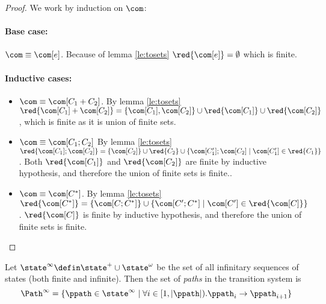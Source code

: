 \begin{proof}
  We work by induction on \(\com\):

  \noindent
  \paragraph*{Base case:\\}
  
  \(\com \equiv \com[e]\). Because of lemma \ref{le:tosets}
  \(\red{\com[e]} = \emptyset\) which is finite.

  \noindent
  \paragraph*{Inductive cases:\\}
  \begin{itemize}
  \item \(\com \equiv \com[C_1 + C_2]\). By lemma \ref{le:tosets}
    \(\red{\com[C_1] + \com[C_2]} = \{\com[C_1], \com[C_2]\} \cup
    \red{\com[C_1]} \cup \red{\com[C_2]}\), which is finite as it is
    union of finite sets.
  \item \(\com \equiv \com[C_1;C_2]\) By lemma \ref{le:tosets}
    \(\red{\com[C_1]; \com[C_2]} =
    \{\com[C_2]\}\cup\red{C_2}\cup\{\com[C_1'];\com[C_2] \mid
    \com[C_1']\in\red{C_1}\}\). Both \(\red{\com[C_1]}\) and
    \(\red{\com[C_2]}\) are finite by inductive hypothesis, and
    therefore the union of finite sets is finite..
  \item \(\com \equiv \com[C^*]\). By lemma \ref{le:tosets}
    \(\red{\com[C^*]} = \{\com[C;C^*]\} \cup \{\com[C';C^*] \mid
    \com[C']\in\red{\com[C]}\}\). \(\red{\com[C]}\) is finite by
    inductive hypothesis, and therefore the union of finite sets is
    finite.
  \end{itemize}
\end{proof}

\begin{definition}[Paths]
  Let \(\state^\infty \defin \state^+ \cup \state^\omega\) be the set
  of all infinitary sequences of states (both finite and
  infinite). Then the set of \emph{paths} in the transition system
  is \[\Path^\infty = \{\ppath \in \state^\infty \mid \forall i \in [
    1, | \ppath | ) . \ppath_i \to \ppath_{i+1}\}\]
\end{definition}
